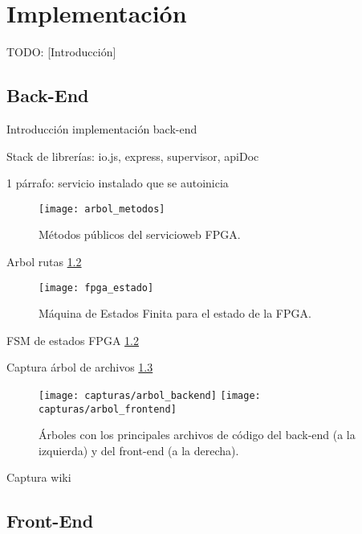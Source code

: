 \chapter{Implementación\label{cap:implementacion}}

TODO: [Introducción]


\section{Back-End\label{sec:imp:back_end}}

Introducción implementación back-end

Stack de librerías: io.js, express, supervisor, apiDoc

1 párrafo: servicio instalado que se autoinicia

\begin{figure}[!htp]
  \centering
  \texttt{[image: arbol\_metodos]}
  \caption{Métodos públicos del \gls{servicioweb} \gls{FPGA}.}
  \label{fig:arbol_metodos}
\end{figure}

Arbol rutas \ref{fig:fpga_estado}

\begin{figure}[!htp]
  \centering
  \texttt{[image: fpga\_estado]}
  \caption{Máquina de Estados Finita para el estado de la \gls{FPGA}.}
  \label{fig:fpga_estado}
\end{figure}

FSM de estados FPGA \ref{fig:fpga_estado}

Captura árbol de archivos \ref{fig:arbol_codigo}

\begin{figure}[!htp]
  \begin{center}
    \texttt{[image: capturas/arbol\_backend]}
    \hspace{1cm}
    \texttt{[image: capturas/arbol\_frontend]}
  \caption{Árboles con los principales archivos de código del \gls{back-end} (a la izquierda) y del \gls{front-end} (a la derecha).}
  \label{fig:arbol_codigo}
  \end{center}
\end{figure}

Captura wiki


\section{Front-End\label{sec:imp:front_end}}

